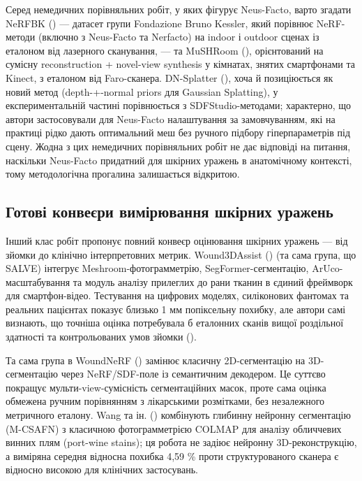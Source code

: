 \documentclass[
  ukrainian,
  10pt,
  a4paper,
  twocolumn]{article}
\begin{document}
Серед немедичних порівняльних робіт, у яких фігурує Neus-Facto, варто
згадати NeRFBK () ---
датасет групи Fondazione Bruno Kessler, який порівнює NeRF-методи
(включно з Neus-Facto та Nerfacto) на indoor і outdoor сценах із
еталоном від лазерного сканування, --- та MuSHRoom
(), орієнтований на
сумісну reconstruction + novel-view synthesis у кімнатах, знятих
смартфонами та Kinect, з еталоном від Faro-сканера. DN-Splatter
(),
хоча й позиціюється як новий метод (depth-+-normal priors для Gaussian
Splatting), у експериментальній частині порівнюється з
SDFStudio-методами; характерно, що автори застосовували для Neus-Facto
налаштування за замовчуванням, які на практиці рідко дають оптимальний
меш без ручного підбору гіперпараметрів під сцену. Жодна з цих
немедичних порівняльних робіт не дає відповіді на питання, наскільки
Neus-Facto придатний для шкірних уражень в анатомічному контексті, тому
методологічна прогалина залишається відкритою.

\subsection{Готові конвеєри вимірювання шкірних
уражень}\label{ux433ux43eux442ux43eux432ux456-ux43aux43eux43dux432ux435ux454ux440ux438-ux432ux438ux43cux456ux440ux44eux432ux430ux43dux43dux44f-ux448ux43aux456ux440ux43dux438ux445-ux443ux440ux430ux436ux435ux43dux44c}

Інший клас робіт пропонує повний конвеєр оцінювання шкірних уражень ---
від зйомки до клінічно інтерпретовних метрик. Wound3DAssist
() (та сама група, що SALVE) інтегрує Meshroom-фотограмметрію,
SegFormer-сегментацію, ArUco-масштабування та модуль аналізу прилеглих
до рани тканин в єдиний фреймворк для смартфон-відео. Тестування на
цифрових моделях, силіконових фантомах та реальних пацієнтах показує
близько 1 мм попіксельну похибку, але автори самі визнають, що точніша
оцінка потребувала б еталонних сканів вищої роздільної здатності та
контрольованих умов зйомки
().

Та сама група в WoundNeRF
() замінює
класичну 2D-сегментацію на 3D-сегментацію через NeRF/SDF-поле із
семантичним декодером. Це суттєво покращує мульти-view-сумісність
сегментаційних масок, проте сама оцінка обмежена ручним порівнянням з
лікарськими розмітками, без незалежного метричного еталону. Wang та ін.
() комбінують глибинну
нейронну сегментацію (M-CSAFN) з класичною фотограмметрією COLMAP для
аналізу обличчевих винних плям (port-wine stains); ця робота не задіює
нейронну 3D-реконструкцію, а виміряна середня відносна похибка 4,59 \%
проти структурованого сканера є відносно високою для клінічних
застосувань.
\end{document}
